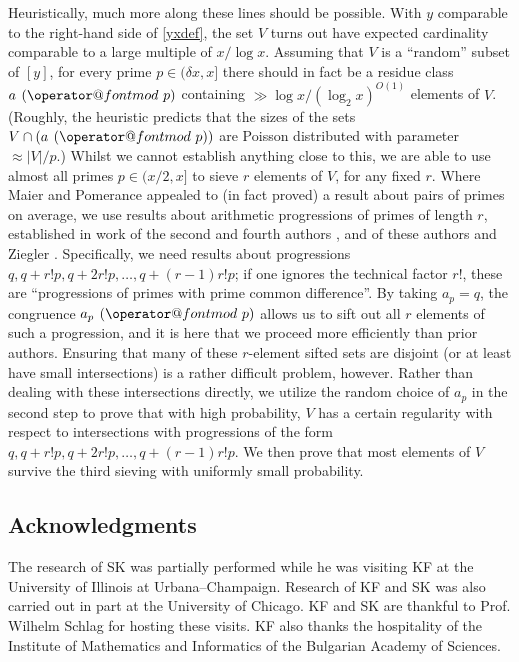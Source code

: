 \documentclass[12pt]{amsart}
\makeatletter
\numberwithin{equation}{section}  %
\theoremstyle{remark}
\theoremstyle{plain}
\numberwithin{equation}{section}
\renewcommand{\pmod}[1]{\allowbreak\mkern7mu({\operator@font mod}\,\,#1)}
\newcommand{\del}{\ensuremath{\delta}}
\renewcommand{\(}{\left(}
\renewcommand{\)}{\right)}
\makeatother
\begin{document}
Heuristically, much more along these lines should be possible. With $y$ comparable to the right-hand side of \eqref{yxdef}, the set $V$ turns out have expected cardinality comparable to a large multiple of $x/\log x$.  Assuming that $V$ is a ``random'' subset of $[y]$, for every 
prime $p\in (\del x,x]$ there should in fact be a residue class $a\pmod p$ containing
$\gg \log x/(\log_2 x)^{O(1)}$ elements of $V$. (Roughly, the heuristic
predicts that the sizes of the sets $V \cap (a\pmod p)$ 
are Poisson distributed with parameter $\approx |V|/p$.) Whilst we
cannot establish anything close to this, we are able to use almost all
primes $p \in (x/2,x]$ to sieve $r$ elements of $V$, for any fixed
  $r$. Where Maier and Pomerance appealed to (in fact proved) a result
  about pairs of primes on average, we use results about arithmetic
  progressions of primes of length $r$, established in work of the
  second and fourth authors \cite{gt-linearprimes},  \cite{gt-nilmobius} and of these authors and
  Ziegler \cite{GTZ}. Specifically, we need results about progressions $q, q+ r!
  p, q+ 2r! p, \dots, q + (r-1)r! p$; if one ignores the technical factor $r!$, these are
  ``progressions of primes with prime common difference''. By taking
  $a_p = q$, the congruence $a_p \pmod{p}$ allows us to sift out all
  $r$ elements of such a progression, and it is here that we proceed
  more efficiently than prior authors. 
Ensuring that many of these $r$-element sifted sets are disjoint (or
at least have small intersections) is a rather difficult
problem, however.  Rather than dealing with these
intersections directly, we utilize the
random choice of $a_p$ in the second step to prove that with high 
probability, $V$ has a certain regularity with respect to 
intersections with progressions of
the form  $q, q+ r! p, q+ 2r! p, \dots, q + (r-1)r! p$.  We then prove
that most elements of $V$ survive the third sieving with uniformly
small probability.

\subsection{Acknowledgments}

The research of SK was partially performed while he was
visiting KF at the University of Illinois at 
Urbana--Champaign.  Research of KF and SK was
also carried out in part at the University of Chicago.
KF and SK are thankful to Prof. Wilhelm Schlag
for hosting these visits.  KF also thanks the
hospitality of the Institute of Mathematics and Informatics of the
Bulgarian Academy of Sciences.
\end{document}
